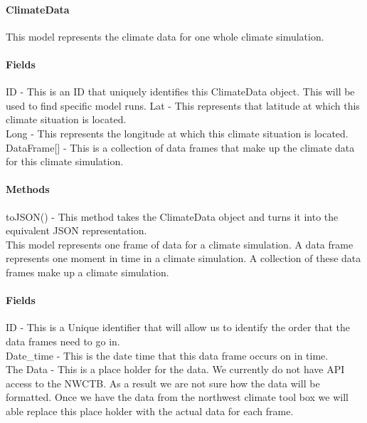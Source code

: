 \documentclass[onecolumn, draftclsnofoot,10pt, compsoc]{article}
\begin{document}
			\paragraph{\textbf{ClimateData}}
				This model represents the climate data for one whole climate simulation.\\
			\paragraph{\textbf{Fields}}
			ID - This is an ID that uniquely identifies this ClimateData object. This will be used to find specific model runs.
			Lat - This represents that latitude at which this climate situation is located.\\
			Long - This represents the longitude at which this climate situation is located.\\
			DataFrame[] - This is a collection of data frames that make up the climate data for this climate simulation.\\
			
			\paragraph{\textbf{Methods}}
			toJSON() - This method takes the ClimateData object and turns it into the equivalent JSON representation.\\
			
				This model represents one frame of data for a climate simulation. A data frame represents one moment in time in a climate simulation. A collection of these data frames make up a climate simulation.\\
			
			\paragraph{\textbf{Fields}}
			ID - This is a Unique identifier that will allow us to identify the order that the data frames need to go in.\\
			Date_time - This is the date time that this data frame occurs on in time.\\
			The Data - This is a place holder for the data. We currently do not have API access to the NWCTB. As a result we are not sure how the data will be formatted. Once we have the data from the northwest climate tool box we will able replace this place holder with the actual data for each frame.\\
			
\end{document}
